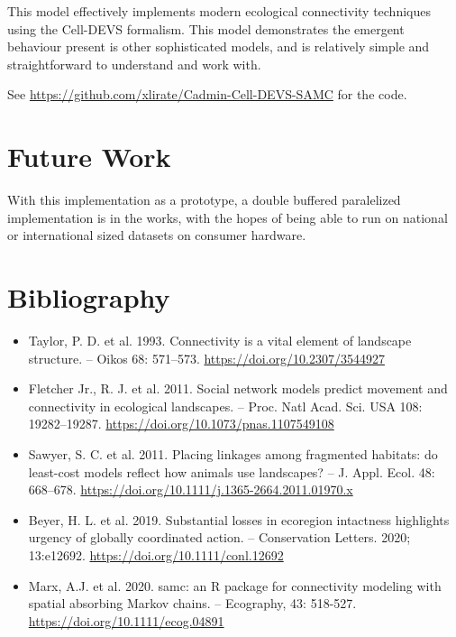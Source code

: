 \documentclass[twocolumn]{article}
\begin{document}
This model effectively implements modern ecological connectivity techniques using the Cell-DEVS formalism. This model demonstrates the emergent behaviour present is other sophisticated models, and is relatively simple and straightforward to understand and work with. 

See \url{https://github.com/xlirate/Cadmin-Cell-DEVS-SAMC} for the code.

\section{Future Work}

With this implementation as a prototype, a double buffered paralelized implementation is in the works, with the hopes of being able to run on national or international sized datasets on consumer hardware. 

\section{Bibliography}

\begin{itemize}

\item Taylor, P. D. et al. 1993. Connectivity is a vital element of landscape
structure. – Oikos 68: 571–573. \url{
	https://doi.org/10.2307/3544927 }

\item Fletcher Jr., R. J. et al. 2011. Social network models predict movement and connectivity in ecological landscapes. – Proc. Natl
Acad. Sci. USA 108: 19282–19287. \url{https://doi.org/10.1073/pnas.1107549108}

\item Sawyer, S. C. et al. 2011. Placing linkages among fragmented habitats: do least-cost models reflect how animals use landscapes?
– J. Appl. Ecol. 48: 668–678. \url{https://doi.org/10.1111/j.1365-2664.2011.01970.x}

\item Beyer, H. L. et al. 2019. Substantial losses in ecoregion intactness highlights urgency of globally coordinated action. – Conservation Letters. 2020; 13:e12692. \url{https://doi.org/10.1111/conl.12692}

\item Marx, A.J. et al. 2020. samc: an R package for connectivity modeling with spatial absorbing Markov chains. – Ecography, 43: 518-527. \url{https://doi.org/10.1111/ecog.04891}

\end{itemize}
\end{document}
